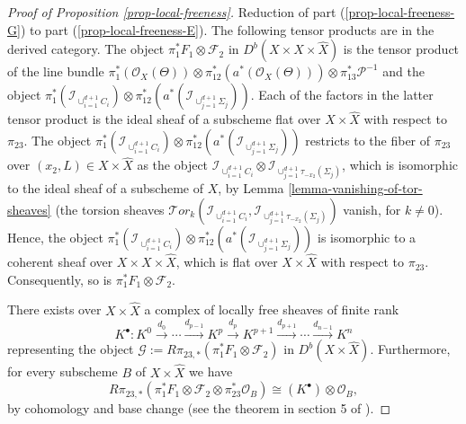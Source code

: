 \documentclass[12pt]{amsart}
\numberwithin{equation}{subsection}
\theoremstyle{plain}
\theoremstyle{definition}
\newcommand{\F}{{\mathcal F}}
\newcommand{\G}{{\mathcal G}}
\renewcommand{\P}{{\mathcal P}}
\newcommand{\RightArrowOf}[1]{\stackrel{#1}{\rightarrow}}
\newcommand{\StructureSheaf}[1]{{\mathcal O}_{#1}}
\newcommand{\SheafTor}{{\mathcal Tor}}
\newcommand{\Ideal}[1]{{\mathcal I}_{#1}}
\begin{document}
\begin{proof}[Proof of Proposition \ref{prop-local-freeness}]
Reduction of part (\ref{prop-local-freeness-G}) to part (\ref{prop-local-freeness-E}). The following tensor products are in the derived category.
The object $\pi_1^*F_1\otimes\F_2$ in $D^b(X\times X\times\hat{X})$ is the tensor product of the line bundle $\pi_1^*(\StructureSheaf{X}(\Theta))\otimes \pi_{12}^*(a^*(\StructureSheaf{X}(\Theta)))\otimes\pi_{13}^*\P^{-1}$ and the object $\pi_1^*(\Ideal{\cup_{i=1}^{d+1}C_i})\otimes \pi_{12}^*(a^*(\Ideal{\cup_{j=1}^{d+1}\Sigma_j}))$. 
Each of the factors in the latter tensor product is the ideal sheaf of a subscheme flat over $X\times\hat{X}$ with respect to $\pi_{23}$.
The object $\pi_1^*(\Ideal{\cup_{i=1}^{d+1}C_i})\otimes \pi_{12}^*(a^*(\Ideal{\cup_{j=1}^{d+1}\Sigma_j}))$
restricts to the fiber of $\pi_{23}$ over $(x_2,L)\in X\times\hat{X}$ as the object $\Ideal{\cup_{i=1}^{d+1}C_i}\otimes \Ideal{\cup_{j=1}^{d+1}\tau_{-x_2}(\Sigma_j)}$, which is isomorphic to the ideal sheaf of a subscheme of $X$, by Lemma \ref{lemma-vanishing-of-tor-sheaves} (the torsion sheaves 
$\SheafTor_k\left(\Ideal{\cup_{i=1}^{d+1}C_i}, \Ideal{\cup_{j=1}^{d+1}\tau_{-x_2}(\Sigma_j)}\right)$ vanish, for $k\neq 0$). Hence, the object 
$\pi_1^*(\Ideal{\cup_{i=1}^{d+1}C_i})\otimes \pi_{12}^*(a^*(\Ideal{\cup_{j=1}^{d+1}\Sigma_j}))$ is isomorphic to a coherent sheaf over $X\times X\times\hat{X}$, which is flat over $X\times \hat{X}$ with respect to $\pi_{23}$. Consequently,  so is $\pi_1^*F_1\otimes\F_2$. 

There exists over $X\times\hat{X}$ a complex of locally free sheaves of finite rank 
\[
K^\bullet :
K^0\RightArrowOf{d_0}  \cdots \RightArrowOf{d_{p-1}} K^p \RightArrowOf{d_p} K^{p+1} \RightArrowOf{d_{p+1}} \cdots \RightArrowOf{d_{n-1}} K^n
\]
representing the object $\G:=R\pi_{23,*}(\pi_1^*F_1\otimes\F_2)$ in $D^b(X\times\hat{X})$. Furthermore, for every subscheme $B$ of $X\times\hat{X}$ we have
\[
R\pi_{23,*}(\pi_1^*F_1\otimes\F_2\otimes \pi_{23}^*\StructureSheaf{B})\cong (K^\bullet)\otimes \StructureSheaf{B},
\]
by cohomology and base change (see the theorem in section 5 of \cite{mumford-abelian-varieties}).


\end{proof}
\end{document}
